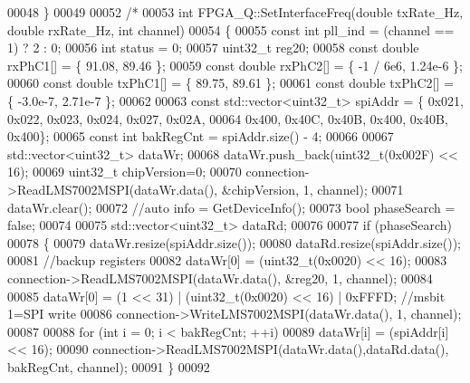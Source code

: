 \begin{DoxyCode}
00048 \}
00049 
00052 \textcolor{comment}{/*}
00053 \textcolor{comment}{int FPGA\_Q::SetInterfaceFreq(double txRate\_Hz, double rxRate\_Hz, int channel)}
00054 \textcolor{comment}{\{}
00055 \textcolor{comment}{    const int pll\_ind = (channel == 1) ? 2 : 0;}
00056 \textcolor{comment}{    int status = 0;}
00057 \textcolor{comment}{    uint32\_t reg20;}
00058 \textcolor{comment}{    const double rxPhC1[] = \{ 91.08, 89.46 \};}
00059 \textcolor{comment}{    const double rxPhC2[] = \{ -1 / 6e6, 1.24e-6 \};}
00060 \textcolor{comment}{    const double txPhC1[] = \{ 89.75, 89.61 \};}
00061 \textcolor{comment}{    const double txPhC2[] = \{ -3.0e-7, 2.71e-7 \};}
00062 \textcolor{comment}{}
00063 \textcolor{comment}{    const std::vector<uint32\_t> spiAddr = \{ 0x021, 0x022, 0x023, 0x024, 0x027, 0x02A,}
00064 \textcolor{comment}{                                            0x400, 0x40C, 0x40B, 0x400, 0x40B, 0x400\};}
00065 \textcolor{comment}{    const int bakRegCnt = spiAddr.size() - 4;}
00066 \textcolor{comment}{    }
00067 \textcolor{comment}{    std::vector<uint32\_t> dataWr;}
00068 \textcolor{comment}{    dataWr.push\_back(uint32\_t(0x002F) << 16);}
00069 \textcolor{comment}{    uint32\_t chipVersion=0;}
00070 \textcolor{comment}{    connection->ReadLMS7002MSPI(dataWr.data(), &chipVersion, 1, channel);}
00071 \textcolor{comment}{    dataWr.clear(); }
00072 \textcolor{comment}{    //auto info = GetDeviceInfo();}
00073 \textcolor{comment}{    bool phaseSearch = false;}
00074 \textcolor{comment}{}
00075 \textcolor{comment}{    std::vector<uint32\_t> dataRd;}
00076 \textcolor{comment}{}
00077 \textcolor{comment}{    if (phaseSearch)}
00078 \textcolor{comment}{    \{}
00079 \textcolor{comment}{        dataWr.resize(spiAddr.size());}
00080 \textcolor{comment}{        dataRd.resize(spiAddr.size());}
00081 \textcolor{comment}{        //backup registers}
00082 \textcolor{comment}{        dataWr[0] = (uint32\_t(0x0020) << 16);}
00083 \textcolor{comment}{        connection->ReadLMS7002MSPI(dataWr.data(), &reg20, 1, channel);}
00084 \textcolor{comment}{}
00085 \textcolor{comment}{        dataWr[0] = (1 << 31) | (uint32\_t(0x0020) << 16) | 0xFFFD; //msbit 1=SPI write}
00086 \textcolor{comment}{        connection->WriteLMS7002MSPI(dataWr.data(), 1, channel);}
00087 \textcolor{comment}{}
00088 \textcolor{comment}{        for (int i = 0; i < bakRegCnt; ++i)}
00089 \textcolor{comment}{            dataWr[i] = (spiAddr[i] << 16);}
00090 \textcolor{comment}{        connection->ReadLMS7002MSPI(dataWr.data(),dataRd.data(), bakRegCnt, channel);}
00091 \textcolor{comment}{    \}}
00092 \textcolor{comment}{}

\end{DoxyCode}
